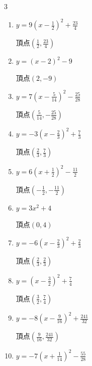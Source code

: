 \begin{multicols}{3}
\begin{enumerate}
        $\displaystyle 頂点\left( \frac{3}{4} , \frac{43}{8} \right)$

  \item $\displaystyle y=9\left( x-\frac{1}{2}\right)^{2}+\frac{23}{4}$

        $\displaystyle 頂点\left( \frac{1}{2} , \frac{23}{4} \right)$

  \item $\displaystyle y=\left( x-2\right)^{2}-9$

        $\displaystyle 頂点\left( 2 , -9 \right)$

  \item $\displaystyle y=7\left( x-\frac{5}{14}\right)^{2}-\frac{25}{28}$

        $\displaystyle 頂点\left( \frac{5}{14} , -\frac{25}{28} \right)$

  \item $\displaystyle y=-3\left( x-\frac{2}{3}\right)^{2}+\frac{7}{3}$

        $\displaystyle 頂点\left( \frac{2}{3} , \frac{7}{3} \right)$

  \item $\displaystyle y=6\left( x+\frac{1}{2}\right)^{2}-\frac{11}{2}$

        $\displaystyle 頂点\left( -\frac{1}{2} , -\frac{11}{2} \right)$

\columnbreak %

  \item $\displaystyle y=3x^{2}+4$

        $\displaystyle 頂点\left( 0 , 4 \right)$

  \item $\displaystyle y=-6\left( x-\frac{2}{3}\right)^{2}+\frac{2}{3}$

        $\displaystyle 頂点\left( \frac{2}{3} , \frac{2}{3} \right)$

  \item $\displaystyle y=\left( x-\frac{3}{2}\right)^{2}+\frac{7}{4}$

        $\displaystyle 頂点\left( \frac{3}{2} , \frac{7}{4} \right)$

  \item $\displaystyle y=-8\left( x-\frac{9}{16}\right)^{2}+\frac{241}{32}$

        $\displaystyle 頂点\left( \frac{9}{16} , \frac{241}{32} \right)$

  \item $\displaystyle y=-7\left( x+\frac{1}{14}\right)^{2}-\frac{55}{28}$


\end{enumerate}
\end{multicols}
